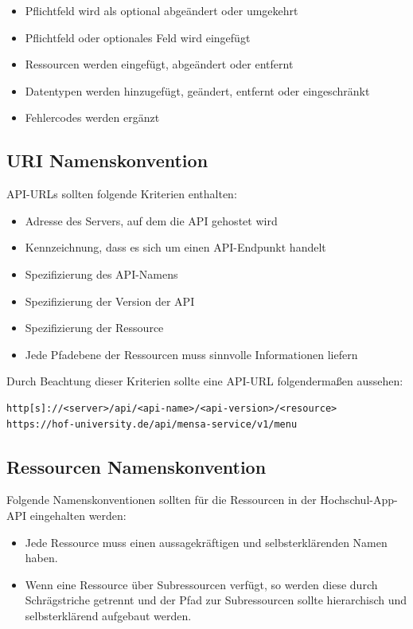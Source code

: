 \begin{itemize}
\item Pflichtfeld wird als optional abgeändert oder umgekehrt
\item Pflichtfeld oder optionales Feld wird eingefügt
\item Ressourcen werden eingefügt, abgeändert oder entfernt
\item Datentypen werden hinzugefügt, geändert, entfernt oder eingeschränkt
\item Fehlercodes werden ergänzt
\end{itemize}

\subsection{URI Namenskonvention}

\ac{API}-\acp{URL} sollten folgende Kriterien enthalten:

\begin{itemize}
\item Adresse des Servers, auf dem die \ac{API} gehostet wird
\item Kennzeichnung, dass es sich um einen \ac{API}-Endpunkt handelt
\item Spezifizierung des \ac{API}-Namens
\item Spezifizierung der Version der \ac{API}
\item Spezifizierung der Ressource
\item Jede Pfadebene der Ressourcen muss sinnvolle Informationen liefern
\end{itemize}

Durch Beachtung dieser Kriterien sollte eine \ac{API}-\ac{URL} folgendermaßen aussehen:

\begin{lstlisting}[caption={URL Namenskonvention}, commentstyle=\color{black},]
http[s]://<server>/api/<api-name>/<api-version>/<resource>
https://hof-university.de/api/mensa-service/v1/menu
\end{lstlisting}

\subsection{Ressourcen Namenskonvention}

Folgende Namenskonventionen sollten für die Ressourcen in der Hochschul-\ac{App}-\ac{API} eingehalten werden:

\begin{itemize}
\item Jede Ressource muss einen aussagekräftigen und selbsterklärenden Namen haben. 
\item Wenn eine Ressource über Subressourcen verfügt, so werden diese durch Schrägstriche getrennt und der Pfad zur Subressourcen sollte hierarchisch und selbsterklärend aufgebaut werden.
\end{itemize}


